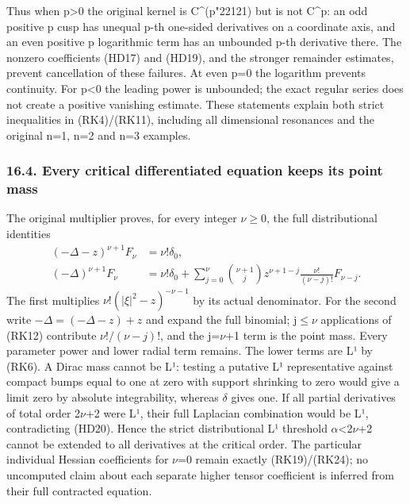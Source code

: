 \documentclass[
  11pt,
]{article}
\begin{document}
Thus when p\textgreater0 the original kernel is C\^{}(p{\ReaderSymbols\char"2212}1) but is not
C\^{}p: an odd positive p cusp has unequal p-th one-sided derivatives on
a coordinate axis, and an even positive p logarithmic term has an
unbounded p-th derivative there. The nonzero coefficients (HD17) and
(HD19), and the stronger remainder estimates, prevent cancellation of
these failures. At even p=0 the logarithm prevents continuity. For
p\textless0 the leading power is unbounded; the exact regular series
does not create a positive vanishing estimate. These statements explain
both strict inequalities in (RK4)/(RK11), including all dimensional
resonances and the original n=1, n=2 and n=3 examples.

\subsubsection{16.4. Every critical differentiated equation keeps its
point
mass}\label{every-critical-differentiated-equation-keeps-its-point-mass}

The original multiplier proves, for every integer \ensuremath{\nu}\ensuremath{\geq}0, the full
distributional identities \[
\begin{split}
(-\Delta-z)^{\nu+1}F_\nu&=\nu!\delta_0,\\
(-\Delta)^{\nu+1}F_\nu
 &=\nu!\delta_0+
   \sum_{j=0}^{\nu}\binom{\nu+1}{j}
        z^{\nu+1-j}\frac{\nu!}{(\nu-j)!}F_{\nu-j}.
\end{split}
\tag{HD20}
\] The first multiplies \(\nu!(|\xi|^2-z)^{-\nu-1}\) by its actual
denominator. For the second write \(-\Delta=(-\Delta-z)+z\) and expand
the full binomial; j\ensuremath{\leq}\ensuremath{\nu} applications of (RK12) contribute
\(\nu!/(\nu-j)!\), and the j=\ensuremath{\nu}+1 term is the point mass. Every parameter
power and lower radial term remains. The lower terms are L¹ by (RK6). A
Dirac mass cannot be L¹: testing a putative L¹ representative against
compact bumps equal to one at zero with support shrinking to zero would
give a limit zero by absolute integrability, whereas \ensuremath{\delta} gives one. If all
partial derivatives of total order 2\ensuremath{\nu}+2 were L¹, their full Laplacian
combination would be L¹, contradicting (HD20). Hence the strict
distributional L¹ threshold \textbar \ensuremath{\alpha}\textbar\textless2\ensuremath{\nu}+2 cannot be
extended to all derivatives at the critical order. The particular
individual Hessian coefficients for \ensuremath{\nu}=0 remain exactly (RK19)/(RK24); no
uncomputed claim about each separate higher tensor coefficient is
inferred from their full contracted equation.
\end{document}
